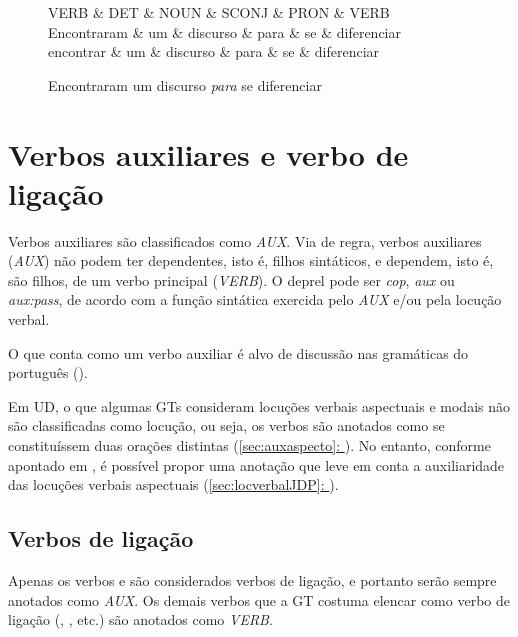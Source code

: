 \documentclass[output=paper,colorlinks,citecolor=brown]{langscibook}
\newcommand*{\fullref}[1]{\hyperref[{#1}]{\autoref*{#1}: \nameref*{#1}}} %
\begin{document}
		\begin{figure}[htbp]
					\centering
					\vspace{.8cm}
					\begin{dependency}
						\begin{deptext}
							VERB \& DET \& NOUN \& SCONJ \& PRON \& VERB \\
							Encontraram \& um \& discurso \& para \& se \& diferenciar \\
							encontrar \& um \& discurso \& para \& se \& diferenciar \\
						\end{deptext}
					\end{dependency}\label{dep:classesdinamicas}
					\caption{Encontraram um discurso \emph{para} se diferenciar}
				\end{figure}


\section{Verbos auxiliares e verbo de ligação}\label{sec:verbosauxiliares}

	Verbos auxiliares são classificados como \emph{AUX}. Via de regra, verbos auxiliares (\emph{AUX}) não podem ter dependentes, isto é, filhos sintáticos, e dependem, isto é, são filhos, de um verbo principal (\emph{VERB}). O deprel pode ser \emph{cop}, \emph{aux} ou \emph{aux:pass}, de acordo com a função sintática exercida pelo \emph{AUX} e/ou pela locução verbal.

	O que conta como um verbo auxiliar é alvo de discussão nas gramáticas do português (\citet{elvis2019locverbal}).

	Em UD, o que algumas GTs consideram locuções verbais aspectuais e modais não são classificadas como locução, ou seja, os verbos são anotados como se constituíssem duas orações distintas (\fullref{sec:auxaspecto}). No entanto, conforme apontado em \citet{elvis2019locverbal}, é possível propor uma anotação que leve em conta a auxiliaridade das locuções verbais aspectuais (\fullref{sec:locverbalJDP}).

	\subsection{Verbos de ligação}\label{sec:verbosdeligacao}
	
		Apenas os verbos  e  são considerados verbos de ligação, e portanto serão sempre anotados como \textit{AUX}. Os demais verbos que a GT costuma elencar como verbo de ligação (, , etc.) são anotados como \textit{VERB}.
\end{document}
